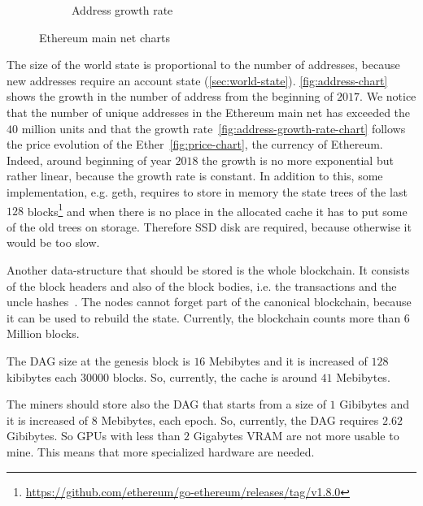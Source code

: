 \begin{figure}
\begin{subfigure}[b]{0.5\textwidth}
        \caption{Address growth rate}
        \label{fig:address-growth-rate-chart}
    \end{subfigure}
    \caption{Ethereum main net charts}
\end{figure}

The size of the world state is proportional to the number of addresses, because
new addresses require an account state (\autoref{sec:world-state}).
\autoref{fig:address-chart} shows the growth in the number of address from the
beginning of $2017$. We notice that the number of unique addresses in the
Ethereum main net has exceeded the $40$ million units and that the growth
rate~\autoref{fig:address-growth-rate-chart} follows the price evolution of the
Ether~\autoref{fig:price-chart}, the currency of Ethereum. Indeed, around
beginning of year $2018$ the growth is no more exponential but rather linear,
because the growth rate is constant.
In addition to this, some implementation, e.g. geth, requires to store in memory
the state trees of the last $128$
blocks\footnote{\url{https://github.com/ethereum/go-ethereum/releases/tag/v1.8.0}}
and when there is no place in the allocated cache it has to
put some of the old trees on storage. Therefore SSD disk are required, because
otherwise it would be too slow.

Another data-structure that should be stored is the whole blockchain. It
consists of the block headers and also of the block bodies, i.e. the
transactions and the uncle hashes~\cite{wood2018ethereum}. The nodes cannot
forget part of the canonical blockchain, because it can be used to rebuild
the state. Currently, the blockchain counts more than $6$ Million blocks.

The DAG size at the genesis block is $16$ Mebibytes and it is increased of $128$
kibibytes each $30000$ blocks. So, currently, the cache is around $41$
Mebibytes.

The miners should store also the DAG that starts from a size of $1$ Gibibytes
and it is increased of $8$ Mebibytes, each epoch. So, currently, the DAG
requires $2.62$ Gibibytes. So GPUs with less than $2$ Gigabytes VRAM are not
more usable to mine. This means that more specialized hardware are needed.



